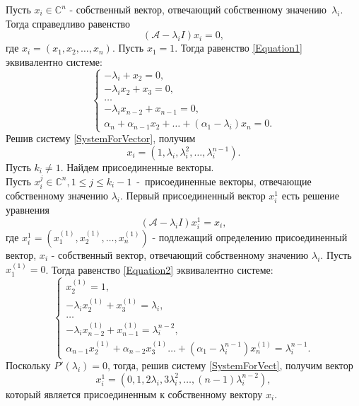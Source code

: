 Пусть $x_i \in \mathbb{C}^n$ - собственный вектор, отвечающий собственному значению~$\lambda_i$. Тогда справедливо равенство
\begin{equation}\label{Equation1}
\left(\mathcal{A}-\lambda_i I \right) x_i = 0,
\end{equation}
где $x_i = \left( x_1, x_2, \dots, x_n \right)$. Пусть $x_1 = 1$. Тогда равенство \eqref{Equation1} эквивалентно системе:
\begin{equation}\label{SystemForVector}
\begin{cases}
-\lambda_i + x_2 = 0, \\
-\lambda_i x_2 + x_3 = 0, \\
\dots \\
-\lambda_i x_{n-2} + x_{n-1} = 0, \\
\alpha_n + \alpha_{n-1} x_2 + \dots + (\alpha_1 - \lambda_i) x_n = 0.
\end{cases}
\end{equation}
Решив систему \eqref{SystemForVector}, получим
$$
x_i = \left( 1, \lambda_i, \lambda_i ^2, \dots, \lambda_i ^{n-1} \right).
$$
Пусть $k_i \ne 1$. Найдем присоединенные векторы. \\
Пусть $x^j_i \in \mathbb{C}^n,1\le j\le k_i-1$~-~присоединенные векторы, отвечающие собственному значению $\lambda_i$. Первый присоединенный вектор $x^1_i$ есть решение уравнения
\begin{equation}\label{Equation2}
\left(\mathcal{A}-\lambda_i I \right) x^1_i = x_i,
\end{equation}
где $x^1_i =  \left( x_1^{(1)}, x_2^{(1)}, \dots, x_n^{(1)} \right)$ - подлежащий определению присоединенный вектор, $x_i$ - собственный вектор, отвечающий собственному значению $\lambda_i$. Пусть $x_1^{(1)} = 0$. Тогда равенство \eqref{Equation2} эквивалентно системе:
\begin{equation}\label{SystemForVect}
\begin{cases}
x_2^{(1)} = 1, \\
-\lambda_i x_2^{(1)} + x_3^{(1)} = \lambda_i, \\
\dots \\
-\lambda_i x_{n-2}^{(1)} + x_{n-1}^{(1)} = \lambda_i ^{n-2}, \\
\alpha_{n-1} x_2^{(1)} + \alpha_{n-2} x_3^{(1)} \dots + (\alpha_1 - \lambda_i ^{n-1}) x_n^{(1)} = \lambda_i ^{n-1}.
\end{cases}
\end{equation}
Поскольку $P'(\lambda_i)=0$, тогда, решив систему \eqref{SystemForVect}, получим вектор 
$$x^1_i = \left(0, 1, 2 \lambda_i, 3 \lambda_i ^2, \dots, (n-1)\lambda_i ^{n-2} \right), $$ который является присоединенным к собственному вектору $x_i$. \\
